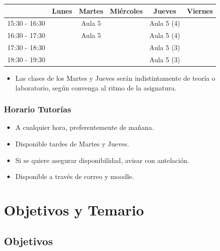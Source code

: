 \documentclass[handout,a4paper,t,xcolor=pst,dvips,colortheme]{beamer}
\begin{document}
\begin{frame}[c]
\begin{small}
{\begin{center}
    	\begin{tabular}{||l|c|c|c|c|c||}
    	\hline \hline
    				   & Lunes & Martes  & Miércoles & Jueves     & Viernes \\ \hline \hline
        15:30 - 16:30  &       & Aula 5  &           & Aula 5 (4) &         \\ \hline
        16:30 - 17:30  &       & Aula 5  &           & Aula 5 (4) &         \\ \hline
    	17:30 - 18:30  &       &         &           & Aula 5 (3) &         \\ \hline
        18:30 - 19:30  &       &         &           & Aula 5 (3) &         \\ \hline
        \hline
    	\end{tabular}
    	\end{center}
    }

	\end{small}
	\begin{itemize}
        \item<3-> Las clases de los Martes y Jueves serán indistintamente de teoría o laboratorio, según convenga al ritmo de la asignatura.
	\end{itemize}
\end{frame}

\begin{frame}[c]
	\frametitle{Horario Tutorías}
    \begin{itemize}[<+->]
        \item A cualquier hora, preferentemente de mañana.
        \item Disponible tardes de Martes y Jueves.
        \item Si se quiere asegurar disponibilidad, avisar con antelación.
        \item Disponible a través de correo y \alert{moodle}.
	\end{itemize}
\end{frame}

\section{Objetivos y Temario}

\subsection{Objetivos}
\end{document}
